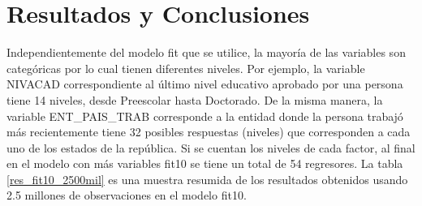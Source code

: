 \section{Resultados y Conclusiones}

Independientemente del modelo \textsf{fit} que se utilice, la mayoría de las variables son categóricas por lo cual tienen diferentes niveles. Por ejemplo, la variable \textsf{NIVACAD} correspondiente al último nivel educativo aprobado por una persona tiene 14 niveles, desde \textsf{Preescolar} hasta \textsf{Doctorado}. De la misma manera, la variable \textsf{ENT\_PAIS\_TRAB}  corresponde a la entidad donde la persona trabajó más recientemente tiene 32 posibles respuestas (niveles) que corresponden a cada uno de los estados de la república. Si se cuentan los niveles de cada factor, al final en el modelo con más variables \textsf{fit10} se tiene un total de 54 regresores. La tabla \ref{res_fit10_2500mil} es una muestra resumida de los resultados obtenidos usando 2.5 millones de observaciones en el modelo \textsf{fit10}.  


